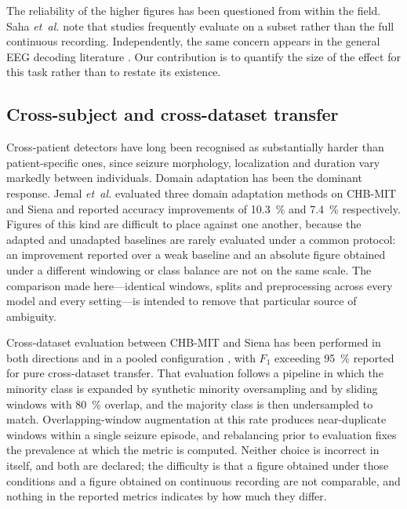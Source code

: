 \documentclass[11pt,a4paper]{article}
\newcommand{\etal}{\textit{et~al.}}
\begin{document}
The reliability of the higher figures has been questioned from within the
field. Saha \etal \citep{saha2024} note that studies frequently evaluate on a
subset rather than the full continuous recording. Independently, the same
concern appears in the general EEG decoding literature
\citep{crosssubjsurvey2026}. Our contribution is to quantify the size of the
effect for this task rather than to restate its existence.

\subsection{Cross-subject and cross-dataset transfer}

Cross-patient detectors have long been recognised as substantially harder
than patient-specific ones, since seizure morphology, localization and
duration vary markedly between individuals. Domain adaptation has been the
dominant response. Jemal \etal \citep{jemal2024} evaluated three domain
adaptation methods on CHB-MIT and Siena and reported accuracy improvements of
\SI{10.3}{\percent} and \SI{7.4}{\percent} respectively. Figures of this
kind are difficult to place against one another, because the adapted and
unadapted baselines are rarely evaluated under a common protocol: an
improvement reported over a weak baseline and an absolute figure obtained
under a different windowing or class balance are not on the same scale. The
comparison made here---identical windows, splits and preprocessing across
every model and every setting---is intended to remove that particular source
of ambiguity.

Cross-dataset evaluation between CHB-MIT and Siena has been performed in both
directions and in a pooled configuration \citep{hybridconv2025}, with $F_1$
exceeding \SI{95}{\percent} reported for pure cross-dataset transfer. That
evaluation follows a pipeline in which the minority class is expanded by
synthetic minority oversampling and by sliding windows with \SI{80}{\percent}
overlap, and the majority class is then undersampled to match.
Overlapping-window augmentation at this rate produces near-duplicate windows
within a single seizure episode, and rebalancing prior to evaluation fixes the
prevalence at which the metric is computed. Neither choice is incorrect in
itself, and both are declared; the difficulty is that a figure obtained under
those conditions and a figure obtained on continuous recording are not
comparable, and nothing in the reported metrics indicates by how much they
differ.
\end{document}

